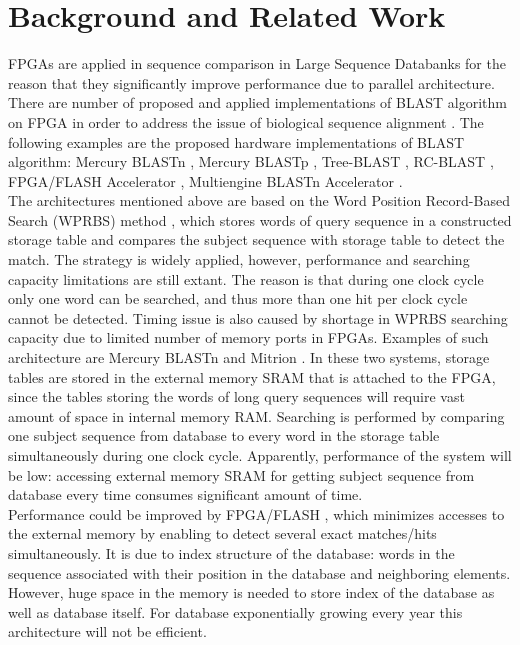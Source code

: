 \section{Background and Related Work}
\label{sec:background}

FPGAs are applied in sequence comparison in Large Sequence Databanks for the reason that they significantly improve performance due to parallel architecture. There are number of proposed and applied implementations of BLAST algorithm on FPGA in order to address the issue of biological sequence alignment \cite{oliver2005hyper}. The following examples are the proposed hardware implementations of BLAST algorithm: Mercury BLASTn \cite{buhler2007mercury}, Mercury BLASTp \cite{harris2007banded}, Tree-BLAST \cite{herbordt2006single}, RC-BLAST \cite{datta2009rc}, FPGA/FLASH Accelerator \cite{lavenier2007reconfigurable}, Multiengine BLASTn Accelerator \cite{sotiriades2007design}. 
\\

The architectures mentioned above are based on the Word Position Record-Based Search (WPRBS) method \cite{guo2012systolic}, which stores words of query sequence in a constructed storage table and compares the subject sequence with storage table to detect the match. The strategy is widely applied, however, performance and searching capacity limitations are still extant. The reason is that during one clock cycle only one word can be searched, and thus more than one hit per clock cycle cannot be detected. Timing issue is also caused by shortage in WPRBS searching capacity due to limited number of memory ports in FPGAs. Examples of such architecture are Mercury BLASTn \cite{buhler2007mercury} and Mitrion \cite{guo2012systolic}. In these two systems, storage tables are stored in the external memory SRAM that is attached to the FPGA, since the tables storing the words of long query sequences will require vast amount of space in internal memory RAM. Searching is performed by comparing one subject sequence from database to every word in the storage table simultaneously during one clock cycle. Apparently, performance of the system will be low: accessing external memory SRAM for getting subject sequence from database every time consumes significant amount of time.    
\\    

Performance could be improved by FPGA/FLASH \cite{lavenier2007reconfigurable}, which minimizes accesses to the external memory by enabling to detect several exact matches/hits simultaneously. It is due to index structure of the database: words in the sequence associated with their position in the database and neighboring elements. However, huge space in the memory is needed to store index of the database as well as database itself. For database exponentially growing every year this architecture will not be efficient. 
\\

